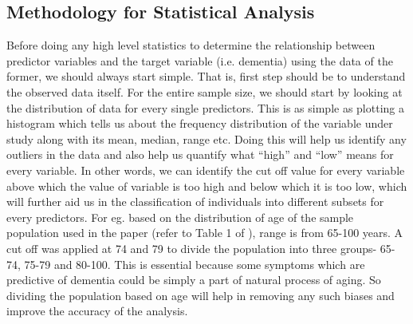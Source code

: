 \documentclass[12pt,letterpaper]{article}
\begin{document}
\subsection{Methodology for Statistical Analysis}

Before doing any high level statistics to determine the relationship between predictor variables and the target variable (i.e. dementia) using the data of the former, we should always start simple. That is, first step should be to understand the observed data itself. For the entire sample size, we should start by  looking at the distribution of data for every single predictors. This is as simple as plotting a histogram which tells us about the frequency distribution of the variable under study along with its mean, median, range etc. Doing this will help us identify any outliers in the data and also help us quantify what ``high'' and ``low'' means for every variable. In other words, we can identify the cut off value for every variable above which the value of variable is too high and below which it is too low, which will further aid us in the classification of individuals into different subsets for every predictors. For eg. based on the distribution of age of the sample population used in the paper (refer to Table 1 of \cite{barnes2009}), range is from 65-100 years. A cut off was applied at 74 and 79 to divide the population into three groups- 65-74, 75-79 and 80-100. This is essential because some symptoms which are predictive of dementia could be simply a part of natural process of aging. So dividing the population based on age will help in removing any such biases and improve the accuracy of the analysis.\\
\end{document}
